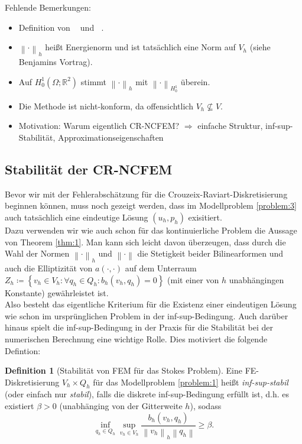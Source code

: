 \documentclass[a4paper]{scrartcl}
\newcommand{\real}{\mathbb{R}}
\newcommand{\Hzero}{H_0^1}
\newcommand{\norm}[1]{\left\lVert#1\right\rVert}
\newcommand{\hnorm}[1]{\left\lVert#1\right\rVert_h}
\newcommand{\set}[1]{\left\{#1\right\}}
\DeclareMathOperator{\divh}{div_h}
\DeclareMathOperator{\nablah}{\nabla_{\textit{h}}}
\theoremstyle{plain}
\theoremstyle{definition}
\newtheorem{definition}{Definition}
\theoremstyle{remark}
\begin{document}
{\color{red}
\noindent Fehlende Bemerkungen: 
\begin{itemize}
\item Definition von \(\nablah\) und \(\divh\).
\item \(\hnorm{\cdot}\) heißt Energienorm und ist tatsächlich eine
  Norm auf \(V_h\) (siehe Benjamins Vortrag).
\item Auf \(\Hzero(\Omega; \real^2)\) stimmt \(\hnorm{\cdot}\) mit
  \(\norm{\cdot}_{\Hzero}\) überein.
\item Die Methode ist nicht-konform, da offensichtlich \(V_h
  \not\subseteq V\).
\item Motivation: Warum eigentlich CR-NCFEM? \(\Rightarrow\) einfache Struktur,
  inf-sup-Stabilität, Approximationseigenschaften
\end{itemize}
}

\subsection{Stabilität der CR-NCFEM}
\label{sec:stabilitat-der-cr}

Bevor wir mit der Fehlerabschätzung für die
Crouzeix-Raviart-Diskretisierung beginnen können, muss noch gezeigt
werden, dass im Modellproblem \ref{problem:3} auch tatsächlich eine
eindeutige Lösung \((u_h,p_h)\) exisitiert. \\

\noindent Dazu verwenden wir wie auch schon für das kontinuierliche Problem die
Aussage von Theorem \ref{thm:1}. Man kann sich leicht davon
überzeugen, dass durch die Wahl der Normen \(\hnorm{\cdot}\) und
\(\norm{\cdot}\) die Stetigkeit beider Bilinearformen und auch die
Elliptizität von \(a(\cdot, \cdot)\) auf dem Unterraum \(Z_h \coloneqq
\set{v_h \in V_h\colon \forall q_h \in Q_h\colon b_h(v_h, q_h) = 0}\)
(mit einer von \(h\) unabhängingen Konstante) gewährleistet ist. \\

\noindent Also besteht das eigentliche Kriterium für die Existenz
einer eindeutigen Lösung wie schon im ursprünglichen Problem in der
inf-sup-Bedingung. Auch darüber hinaus spielt die inf-sup-Bedingung
in der Praxis für die Stabilität bei der numerischen Berechnung eine
wichtige Rolle. Dies motiviert die folgende Defintion: 

\begin{definition}[Stabilität von FEM für das Stokes Problem] \label{def:1}
  Eine FE-Diskretisierung \(V_h\times Q_h\) für das Modellproblem
  \ref{problem:1} heißt \emph{inf-sup-stabil} (oder einfach nur
  \emph{stabil}), falls die diskrete inf-sup-Bedingung erfüllt ist,
  d.h. es existiert \(\beta > 0\) (unabhänging von der Gitterweite
  \(h\)), sodass 
  \begin{equation}
    \label{eq:14}
    \inf_{q_h \in Q_h} \sup_{v_h \in V_h} \frac{b_h(v_h, q_h)}{\hnorm{v_h} \norm{q_h}} \geq \beta. 
  \end{equation}
  \end{definition}
\end{document}
